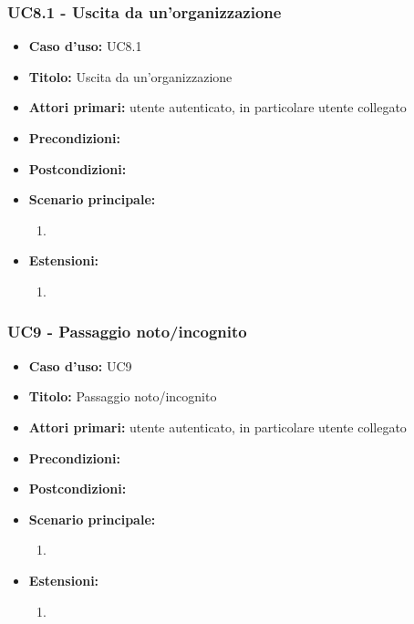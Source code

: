 \documentclass[casi-duso]{subfiles}
\begin{document}
\subsubsection{UC8.1 - Uscita da un'organizzazione}
\label{subsub:uc8.1utente}
\begin{itemize}
  \item \textbf{Caso d’uso:} UC8.1
  \item \textbf{Titolo:} Uscita da un'organizzazione
  \item \textbf{Attori primari:} utente autenticato, in particolare utente collegato
  \item \textbf{Precondizioni:} 
  \item \textbf{Postcondizioni:}
  \item \textbf{Scenario principale:} 
  \begin{enumerate}
    \item 
  \end{enumerate}  
  \item \textbf{Estensioni:} 
  \begin{enumerate}
    \item 
  \end{enumerate}  
\end{itemize}

\subsubsection{UC9 - Passaggio noto/incognito}
\label{subsub:uc9utente}
\begin{itemize}
  \item \textbf{Caso d’uso:} UC9
  \item \textbf{Titolo:} Passaggio noto/incognito
  \item \textbf{Attori primari:} utente autenticato, in particolare utente collegato
  \item \textbf{Precondizioni:} 
  \item \textbf{Postcondizioni:}
  \item \textbf{Scenario principale:} 
  \begin{enumerate}
    \item 
  \end{enumerate}  
  \item \textbf{Estensioni:} 
  \begin{enumerate}
    \item 
  \end{enumerate}  
\end{itemize}
\end{document}
